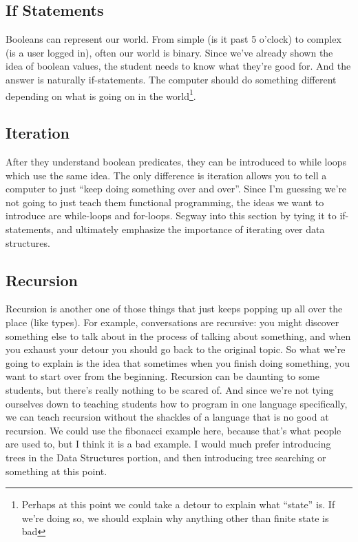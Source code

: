 \documentclass[12pt]{article}
\begin{document}
      \subsection{If Statements}

        Booleans can represent our world. From simple (is it past 5 o'clock) to complex (is a user logged in), often our world is binary. Since we've already shown the idea of boolean values, the student needs to know what they're good for. And the answer is naturally if-statements. The computer should do something different depending on what is going on in the world\footnote{Perhaps at this point we could take a detour to explain what ``state'' is. If we're doing so, we should explain why anything other than finite state is bad}.   

      \subsection{Iteration}

        After they understand boolean predicates, they can be introduced to while loops which use the same idea. The only difference is iteration allows you to tell a computer to just ``keep doing something over and over''. Since I'm guessing we're not going to just teach them functional programming, the ideas we want to introduce are while-loops and for-loops. Segway into this section by tying it to if-statements, and ultimately emphasize the importance of iterating over data structures.

      \subsection{Recursion}

        Recursion is another one of those things that just keeps popping up all over the place (like types). For example, conversations are recursive: you might discover something else to talk about in the process of talking about something, and when you exhaust your detour you should go back to the original topic. So what we're going to explain is the idea that sometimes when you finish doing something, you want to start over from the beginning. Recursion can be daunting to some students, but there's really nothing to be scared of. And since we're not tying ourselves down to teaching students how to program in one language specifically, we can teach recursion without the shackles of a language that is no good at recursion. We could use the fibonacci example here, because that's what people are used to, but I think it is a bad example. I would much prefer introducing trees in the Data Structures portion, and then introducing tree searching or something at this point.  
\end{document}

